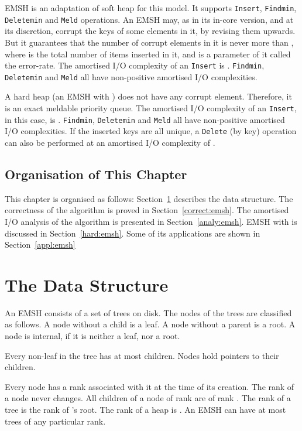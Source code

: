 EMSH is an adaptation of soft heap for this model.
It supports {\tt Insert}, {\tt Findmin}, {\tt Deletemin} and {\tt Meld} operations.
An EMSH may, as in its in-core version, and at its discretion, 
corrupt the keys of some elements in it, by revising them upwards.
But it guarantees that the number of corrupt elements in it is never more than
, where  is the total number of items inserted in it, and  is
a parameter of it called the error-rate.
The amortised I/O complexity of an {\tt Insert} is .
{\tt Findmin}, {\tt Deletemin} and {\tt Meld} all have non-positive amortised I/O complexities.

A hard heap (an EMSH with ) does not have any corrupt element.
Therefore, it is an exact meldable priority queue.
The amortised I/O complexity of an {\tt Insert}, in this case, is .
{\tt Findmin}, {\tt Deletemin} and {\tt Meld} all have non-positive amortised I/O complexities.
If the inserted keys are all unique, a {\tt Delete} (by key) operation can
	also be performed at an amortised I/O complexity of .



\subsection{Organisation of This Chapter}

This chapter is organised as follows: Section~\ref{datastr:emsh} describes the data structure.
The correctness of the algorithm is proved in Section~\ref{correct:emsh}.
The amortised I/O analysis of the algorithm is presented in Section~\ref{analy:emsh}.
EMSH with  is discussed in Section~\ref{hard:emsh}.
Some of its applications are shown in Section~\ref{appl:emsh}
\section{The Data Structure}
\label{datastr:emsh}
An EMSH consists of a set of trees on disk.
The nodes of the trees are classified as follows.  
A node without a child is a leaf. 
A node without a parent is a root.
A node is internal, if it is neither a leaf, nor a root. 

Every non-leaf in the tree has at most  children.
Nodes hold pointers to their children. 

Every node has a rank associated with it at the time of its creation. 
The rank of a node never changes.
All children of a node of rank  are of rank . 
The rank of a tree  is the rank of 's root. 
The rank of a heap  is . 
An EMSH can have at most  trees of any particular rank.


